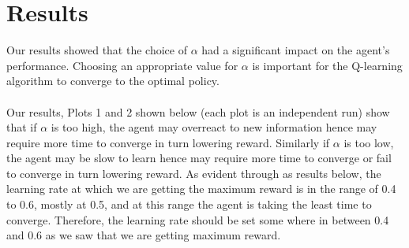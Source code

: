 \documentclass[conference]{IEEEtran}
\begin{document}
\section{Results}
Our results showed that the choice of $\alpha$ had a significant impact on the agent's performance. Choosing an appropriate value for $\alpha$ is important for the Q-learning algorithm to converge to the optimal policy. \\ \\ Our results, Plots 1 and 2 shown below (each plot is an independent run) show that if $\alpha$ is too high, the agent may overreact to new information hence may require more time to converge in turn lowering reward. Similarly if $\alpha$ is too low, the agent may be slow to learn hence may require more time to converge or fail to converge in turn lowering reward. As evident through as results below, the learning rate at which we are getting the maximum reward is in the range of 0.4 to 0.6, mostly at 0.5, and at this range the agent is taking the least time to converge. Therefore, the learning rate should be set some where in between 0.4 and 0.6 as we saw that we are getting maximum reward. 
\end{document}
